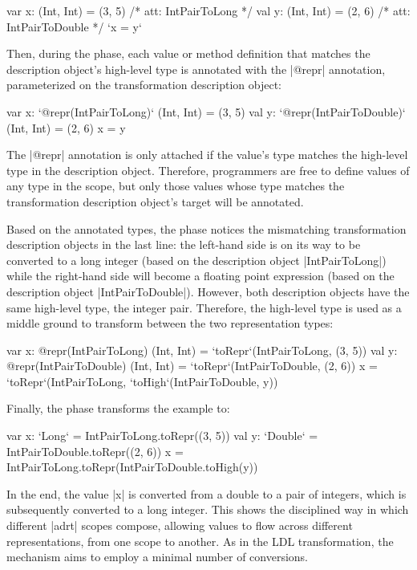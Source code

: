 \begin{lstlisting-nobreak}
var x: (Int, Int) = (3, 5) /* att: IntPairToLong */
val y: (Int, Int) = (2, 6) /* att: IntPairToDouble */
`x = y`
\end{lstlisting-nobreak}

Then, during the \inject{} phase, each value or method definition that matches the description object's high-level type is annotated with the |@repr| annotation, parameterized on the transformation description object:

\begin{lstlisting-nobreak}
var x: `@repr(IntPairToLong)` (Int, Int) = (3, 5)
val y: `@repr(IntPairToDouble)` (Int, Int) = (2, 6)
x = y
\end{lstlisting-nobreak}

The |@repr| annotation is only attached if the value's type matches the high-level type in the description object. Therefore, programmers are free to define values of any type in the scope, but only those values whose type matches the transformation description object's target will be annotated.

Based on the annotated types, the \coerce{} phase notices the mismatching transformation description objects in the last line: the left-hand side is on its way to be converted to a long integer (based on the description object |IntPairToLong|) while the right-hand side will become a floating point expression (based on the description object |IntPairToDouble|). However, both description objects have the same high-level type, the integer pair. Therefore, the high-level type is used as a middle ground to transform between the two representation types:

\begin{lstlisting-nobreak}
var x: @repr(IntPairToLong) (Int, Int) = `toRepr`(IntPairToLong, (3, 5))
val y: @repr(IntPairToDouble) (Int, Int) = `toRepr`(IntPairToDouble, (2, 6))
x = `toRepr`(IntPairToLong, `toHigh`(IntPairToDouble, y))
\end{lstlisting-nobreak}

Finally, the \commit{} phase transforms the example to:

\begin{lstlisting-nobreak}
var x: `Long` = IntPairToLong.toRepr((3, 5))
val y: `Double` = IntPairToDouble.toRepr((2, 6))
x = IntPairToLong.toRepr(IntPairToDouble.toHigh(y))
\end{lstlisting-nobreak}

In the end, the value |x| is converted from a double to a pair of integers, which is subsequently converted to a long integer. This shows the disciplined way in which different |adrt| scopes compose, allowing values to flow across different representations, from one scope to another. As in the LDL transformation, the mechanism aims to employ a minimal number of conversions.

